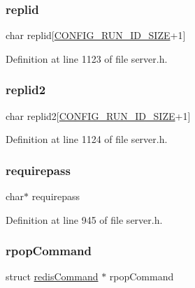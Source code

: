 \subsubsection{\texorpdfstring{replid}{replid}}
{\footnotesize\ttfamily char replid\mbox{[}\hyperlink{server_8h_aba6794fa3ee28f85165eaed93190f1df}{C\+O\+N\+F\+I\+G\+\_\+\+R\+U\+N\+\_\+\+I\+D\+\_\+\+S\+I\+ZE}+1\mbox{]}}



Definition at line 1123 of file server.\+h.

\mbox{\label{structredis_server_a06df01ff396d99c1b22692272de940d7}} 
\subsubsection{\texorpdfstring{replid2}{replid2}}
{\footnotesize\ttfamily char replid2\mbox{[}\hyperlink{server_8h_aba6794fa3ee28f85165eaed93190f1df}{C\+O\+N\+F\+I\+G\+\_\+\+R\+U\+N\+\_\+\+I\+D\+\_\+\+S\+I\+ZE}+1\mbox{]}}



Definition at line 1124 of file server.\+h.

\mbox{\label{structredis_server_a0ba0e84624d22e52e900533adf7d9ba8}} 
\subsubsection{\texorpdfstring{requirepass}{requirepass}}
{\footnotesize\ttfamily char$\ast$ requirepass}



Definition at line 945 of file server.\+h.

\mbox{\label{structredis_server_ad4fa040bb64cd95458a6d5c959daa380}} 
\subsubsection{\texorpdfstring{rpop\+Command}{rpopCommand}}
{\footnotesize\ttfamily struct \hyperlink{structredis_command}{redis\+Command} $\ast$ rpop\+Command}



